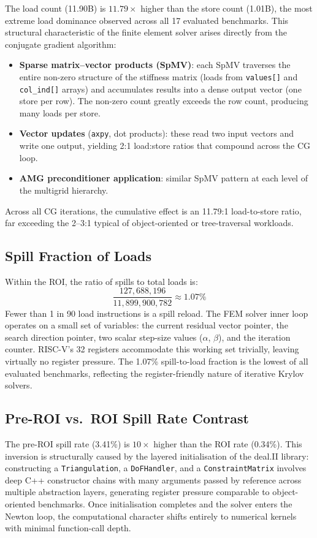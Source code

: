 \documentclass[conference]{IEEEtran}
\begin{document}
The load count (11.90B) is $\mathbf{11.79\times}$ higher than the
store count (1.01B), the most extreme load dominance observed across
all 17 evaluated benchmarks. This structural characteristic of the
finite element solver arises directly from the conjugate gradient
algorithm:
\begin{itemize}
    \item \textbf{Sparse matrix--vector products (SpMV)}: each SpMV
          traverses the entire non-zero structure of the stiffness
          matrix (loads from \texttt{values[]} and \texttt{col\_ind[]}
          arrays) and accumulates results into a dense output vector
          (one store per row). The non-zero count greatly exceeds the
          row count, producing many loads per store.
    \item \textbf{Vector updates} (\texttt{axpy}, dot products): these
          read two input vectors and write one output, yielding 2:1
          load:store ratios that compound across the CG loop.
    \item \textbf{AMG preconditioner application}: similar SpMV
          pattern at each level of the multigrid hierarchy.
\end{itemize}
Across all CG iterations, the cumulative effect is an 11.79:1
load-to-store ratio, far exceeding the 2--3:1 typical of
object-oriented or tree-traversal workloads.

\subsection{Spill Fraction of Loads}

Within the ROI, the ratio of spills to total loads is:
\[
\frac{127{,}688{,}196}{11{,}899{,}900{,}782} \approx 1.07\%
\]
Fewer than 1 in 90 load instructions is a spill reload. The FEM
solver inner loop operates on a small set of variables: the current
residual vector pointer, the search direction pointer, two scalar
step-size values ($\alpha$, $\beta$), and the iteration counter.
RISC-V's 32 registers accommodate this working set trivially, leaving
virtually no register pressure. The 1.07\% spill-to-load fraction
is the lowest of all evaluated benchmarks, reflecting the
register-friendly nature of iterative Krylov solvers.

\subsection{Pre-ROI vs.\ ROI Spill Rate Contrast}

The pre-ROI spill rate (3.41\%) is $10\times$ higher than the ROI
rate (0.34\%). This inversion is structurally caused by the layered
initialisation of the deal.II library: constructing a
\texttt{Triangulation}, a \texttt{DoFHandler}, and a
\texttt{ConstraintMatrix} involves deep C++ constructor chains with
many arguments passed by reference across multiple abstraction layers,
generating register pressure comparable to object-oriented benchmarks.
Once initialisation completes and the solver enters the Newton loop,
the computational character shifts entirely to numerical kernels with
minimal function-call depth.
\end{document}
